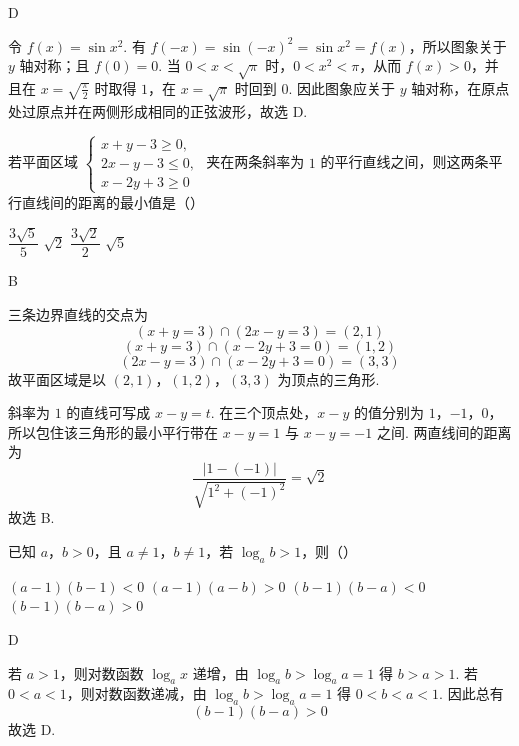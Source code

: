 \begin{answer}
D
\end{answer}

\begin{solution}
令 \(f(x)=\sin x^2\). 有 \(f(-x)=\sin(-x)^2=\sin x^2=f(x)\)，所以图象关于 \(y\) 轴对称；且 \(f(0)=0\). 当 \(0<x<\sqrt{\pi}\) 时，\(0<x^2<\pi\)，从而 \(f(x)>0\)，并且在 \(x=\sqrt{\frac{\pi}{2}}\) 时取得 \(1\)，在 \(x=\sqrt{\pi}\) 时回到 \(0\). 因此图象应关于 \(y\) 轴对称，在原点处过原点并在两侧形成相同的正弦波形，故选 D.
\end{solution}

\begin{problem}
若平面区域
\(\begin{cases}
x+y-3\ge 0,\\
2x-y-3\le 0,\\
x-2y+3\ge 0
\end{cases}\)
夹在两条斜率为 \(1\) 的平行直线之间，则这两条平行直线间的距离的最小值是（\quad）

\choices
    {\(\dfrac{3\sqrt5}{5}\)}
    {\(\sqrt2\)}
    {\(\dfrac{3\sqrt2}{2}\)}
    {\(\sqrt5\)}
\end{problem}

\begin{answer}
B
\end{answer}

\begin{solution}
三条边界直线的交点为
\[
(x+y=3)\cap(2x-y=3)=(2,1)
\]
\[
(x+y=3)\cap(x-2y+3=0)=(1,2)
\]
\[
(2x-y=3)\cap(x-2y+3=0)=(3,3)
\]
故平面区域是以 \((2,1)\)，\((1,2)\)，\((3,3)\) 为顶点的三角形.

斜率为 \(1\) 的直线可写成 \(x-y=t\). 在三个顶点处，\(x-y\) 的值分别为 \(1\)，\(-1\)，\(0\)，所以包住该三角形的最小平行带在 \(x-y=1\) 与 \(x-y=-1\) 之间. 两直线间的距离为
\[
\frac{|1-(-1)|}{\sqrt{1^2+(-1)^2}}=\sqrt2
\]
故选 B.
\end{solution}

\begin{problem}
已知 \(a\)，\(b>0\)，且 \(a\ne1\)，\(b\ne1\)，若 \(\log_a b>1\)，则（\quad）

\choices
    {\((a-1)(b-1)<0\)}
    {\((a-1)(a-b)>0\)}
    {\((b-1)(b-a)<0\)}
    {\((b-1)(b-a)>0\)}
\end{problem}

\begin{answer}
D
\end{answer}

\begin{solution}
若 \(a>1\)，则对数函数 \(\log_a x\) 递增，由 \(\log_a b>\log_a a=1\) 得 \(b>a>1\). 若 \(0<a<1\)，则对数函数递减，由 \(\log_a b>\log_a a=1\) 得 \(0<b<a<1\). 因此总有
\[
(b-1)(b-a)>0
\]
故选 D.
\end{solution}

